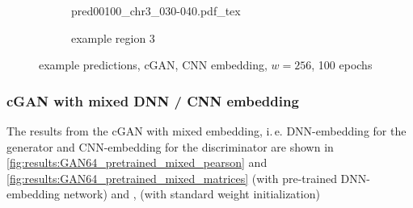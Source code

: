 \begin{figure}\ContinuedFloat
    \begin{subfigure}{\textwidth}
        \centering
        \scriptsize
        {pred00100_chr3_030-040.pdf_tex}
        \caption{example region 3} \label{fig:results:cGAN256_r3}
    \end{subfigure}
    \caption{example predictions, cGAN, CNN embedding, $w=256$, 100 epochs} \label{fig:results:cGAN256_matrices}
\end{figure}

\subsubsection{cGAN with mixed DNN / CNN embedding} \label{sec:results:cgan-mixed}
The results from the cGAN with mixed embedding, i.\,e. DNN-embedding for the generator
and CNN-embedding for the discriminator are shown in \cref{fig:results:GAN64_pretrained_mixed_pearson} and \ref{fig:results:GAN64_pretrained_mixed_matrices} 
(with pre-trained DNN-embedding network) and \xxx, \xxx (with standard weight initialization)

